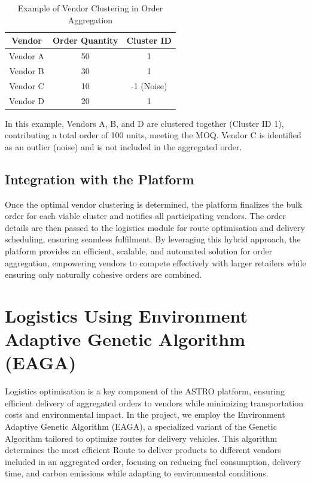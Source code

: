 \begin{table}[h!]
    \centering
    \begin{tabular}{|c|c|c|}
        \hline
        \textbf{Vendor} & \textbf{Order Quantity} & \textbf{Cluster ID} \\
        \hline
        Vendor A        & 50                      & 1                   \\
        Vendor B        & 30                      & 1                   \\
        Vendor C        & 10                      & -1 (Noise)          \\
        Vendor D        & 20                      & 1                   \\
        \hline
    \end{tabular}
    \caption{Example of Vendor Clustering in Order Aggregation}
\end{table}

In this example, Vendors A, B, and D are clustered together (Cluster ID 1), contributing a total order of 100 units, meeting the MOQ. Vendor C is identified as an outlier (noise) and is not included in the aggregated order.

\subsection{Integration with the Platform}

Once the optimal vendor clustering is determined, the platform finalizes the bulk order for each viable cluster and notifies all participating vendors. The order details are then passed to the logistics module for route optimisation and delivery scheduling, ensuring seamless fulfilment. By leveraging this hybrid approach, the platform provides an efficient, scalable, and automated solution for order aggregation, empowering vendors to compete effectively with larger retailers while ensuring only naturally cohesive orders are combined.


\section{Logistics Using Environment Adaptive Genetic Algorithm (EAGA)}

Logistics optimisation is a key component of the ASTRO platform, ensuring efficient delivery of aggregated orders to vendors while minimizing transportation costs and environmental impact. In the project, we employ the Environment Adaptive Genetic Algorithm (EAGA), a specialized variant of the Genetic Algorithm tailored to optimize routes for delivery vehicles. This algorithm determines the most efficient Route to deliver products to different vendors included in an aggregated order, focusing on reducing fuel consumption, delivery time, and carbon emissions while adapting to environmental conditions.


